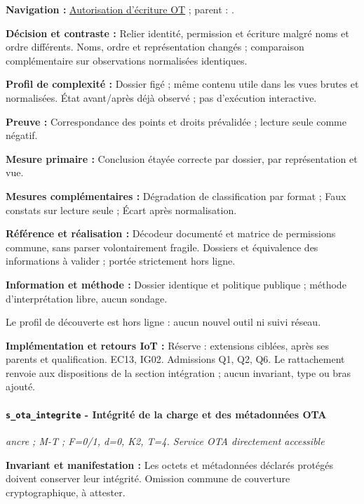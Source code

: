 \documentclass[11pt,a4paper]{article}
\newcommand{\code}[1]{{\small\ttfamily\path{#1}}}
\newcommand{\scenariolink}[1]{\hyperref[scenario:#1]{\code{#1}}}
\newcommand{\comparisonlink}[2]{\hyperlink{comparison:#1}{#2}}
\begin{document}
\textbf{Navigation :} \comparisonlink{E04}{Autorisation d’écriture OT} ; parent : \scenariolink{s_ot_ecriture}.

\textbf{Décision et contraste :} Relier identité, permission et écriture malgré noms et ordre différents. Noms, ordre et représentation changés ; comparaison complémentaire sur observations normalisées identiques.

\textbf{Profil de complexité :} Dossier figé ; même contenu utile dans les vues brutes et normalisées. État avant/après déjà observé ; pas d’exécution interactive.

\textbf{Preuve :} Correspondance des points et droits prévalidée ; lecture seule comme négatif.

\textbf{Mesure primaire :} Conclusion étayée correcte par dossier, par représentation et vue.

\textbf{Mesures complémentaires :} Dégradation de classification par format ; Faux constats sur lecture seule ; Écart après normalisation.

\textbf{Référence et réalisation :} Décodeur documenté et matrice de permissions commune, sans parser volontairement fragile. Dossiers et équivalence des informations à valider ; portée strictement hors ligne.

\textbf{Information et méthode :} Dossier identique et politique publique ; méthode d’interprétation libre, aucun sondage.

Le profil de découverte est hors ligne : aucun nouvel outil ni suivi réseau.

\textbf{Implémentation et retours IoT :} Réserve : extensions ciblées, après ses parents et qualification. EC13, IG02. Admissions Q1, Q2, Q6. Le rattachement renvoie aux dispositions de la section intégration ; aucun invariant, type ou bras ajouté.

\par\noindent\begin{minipage}{\linewidth}\setlength{\parskip}{5pt}\paragraph{\texttt{s\_ota\_integrite} - Intégrité de la charge et des métadonnées OTA}\label{scenario:s_ota_integrite}
\textit{ancre ; M-T ; F=0/1, d=0, K2, T=4. Service OTA directement accessible}

\textbf{Invariant et manifestation :} Les octets et métadonnées déclarés protégés doivent conserver leur intégrité. Omission commune de couverture cryptographique, à attester.\par\end{minipage}\par
\end{document}
